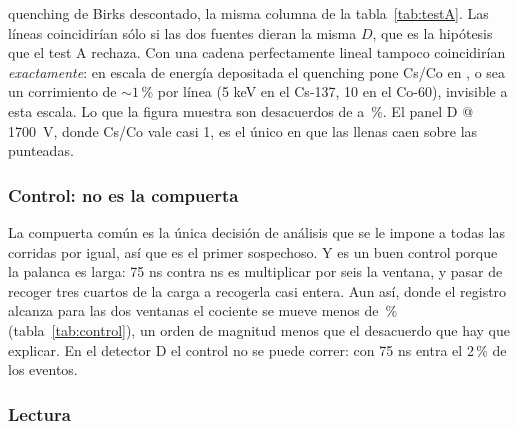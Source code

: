 \documentclass[11pt,a4paper]{article}
\begin{document}
\begin{itemize}
      quenching de Birks descontado, la misma columna de la
      tabla~\ref{tab:testA}. Las líneas coincidirían sólo si las dos fuentes
      dieran la misma $D$, que es la hipótesis que el test A rechaza. Con una
      cadena perfectamente lineal tampoco coincidirían \emph{exactamente}: en
      escala de energía depositada el quenching pone Cs/Co en \CocEsperado, o
      sea un corrimiento de $\sim 1$\,\% por línea (5 keV en el Cs-137, 10 en
      el Co-60), invisible a esta escala. Lo que la figura muestra son
      desacuerdos de \DesacMin{} a \DesacMax\,\%. El panel D @ 1700~V, donde
      Cs/Co vale casi 1, es el único en que las llenas caen sobre las
      punteadas.
\end{itemize}

\subsubsection{Control: no es la compuerta}

La compuerta común es la única decisión de análisis que se le impone a todas
las corridas por igual, así que es el primer sospechoso. Y es un buen control
porque la palanca es larga: 75 ns contra \PostFijo{} ns es multiplicar por seis
la ventana, y pasar de recoger tres cuartos de la carga a recogerla casi
entera. Aun así, donde el registro alcanza para las dos ventanas el cociente se
mueve menos de \ControlMax\,\% (tabla~\ref{tab:control}), un orden de magnitud
menos que el desacuerdo que hay que explicar. En el detector D el control no se
puede correr: con 75 ns entra el 2\,\% de los eventos.

\begin{table}[htbp]
\centering
\caption{El mismo test con otra compuerta, donde el registro lo permite.}
\label{tab:control}
{\small}
\end{table}

\subsubsection{Lectura}
\end{document}
